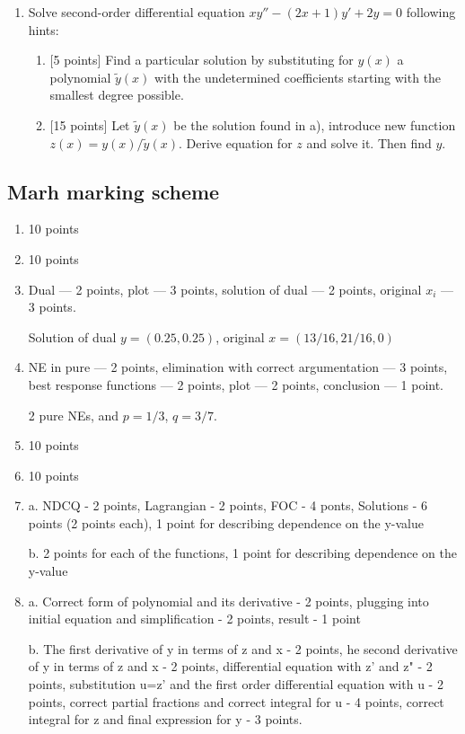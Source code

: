 \documentclass[12pt]{article} %
\theoremstyle{definition} %
\begin{document}
\begin{enumerate}
\item Solve second-order differential equation $xy''-(2x+1)y'+2y=0$ following hints:
	\begin{enumerate}[label=\alph*)]
	    \item {[5 points]} Find a particular solution by substituting for $y(x)$ a polynomial $\tilde y(x)$ with
	      the undetermined coefficients starting with the smallest degree possible.
	    \item {[15 points]} Let $\tilde y(x)$  be the solution found in a),  introduce new function $z(x)=y(x)/\tilde y(x)$.
	      Derive equation for $z$ and solve it. Then find $y$.
	  \end{enumerate}


\end{enumerate}

\subsection{Marh marking scheme}

\begin{enumerate}

\item 10 points
\item 10 points
\item Dual — 2 points, plot — 3 points, solution of dual — 2 points, original $x_i$ — 3 points.

Solution of dual $y = (0.25, 0.25)$, original $x = (13/16, 21/16, 0)$

\item NE in pure — 2 points, elimination with correct argumentation — 3 points, best response functions — 2 points, plot — 2 points, conclusion — 1 point.

2 pure NEs, and $p=1/3$, $q=3/7$.

\item 10 points
\item 10 points

\item
a. NDCQ - 2 points, Lagrangian - 2 points, FOC - 4 ponts, Solutions  - 6 points (2 points each), 1 point for describing dependence on the y-value

b. 2 points for each of the functions, 1 point for describing dependence on the y-value

\item
a. Correct form of polynomial and its derivative - 2 points, plugging into initial equation and simplification - 2 points, result - 1 point

b. The first derivative of y in terms of z and x - 2 points, he second derivative of y in terms of z and x - 2 points, differential equation with z' and z" - 2 points, substitution u=z' and the first order differential equation with u - 2 points, correct partial fractions and correct integral for u - 4 points, correct integral for z and final expression for y - 3 points.


\end{enumerate}
\end{document}
